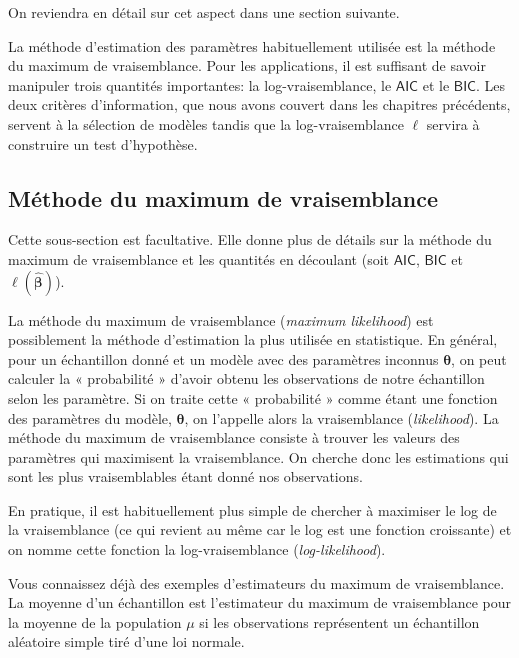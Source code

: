 \documentclass[
  11pt,
  letterpaper,
]{book}
\theoremstyle{definition}
\theoremstyle{definition}
\theoremstyle{definition}
\theoremstyle{definition}
\theoremstyle{remark}
\begin{document}
On reviendra en détail sur cet aspect dans une section suivante.

La méthode d'estimation des paramètres habituellement utilisée est la méthode du maximum de vraisemblance. Pour les applications, il est suffisant de savoir manipuler trois quantités importantes: la log-vraisemblance, le \(\mathsf{AIC}\) et le \(\mathsf{BIC}\). Les deux critères d'information, que nous avons couvert dans les chapitres précédents, servent à la sélection de modèles tandis que la log-vraisemblance \(\ell\) servira à construire un test d'hypothèse.

\hypertarget{muxe9thode-du-maximum-de-vraisemblance}{%
\subsection{Méthode du maximum de vraisemblance}\label{muxe9thode-du-maximum-de-vraisemblance}}

Cette sous-section est facultative. Elle donne plus de détails sur la méthode du maximum de vraisemblance et les quantités en découlant (soit \(\mathsf{AIC}\), \(\mathsf{BIC}\) et \(\ell(\widehat{\boldsymbol{\beta}})\)).

La méthode du maximum de vraisemblance (\emph{maximum likelihood}) est possiblement la méthode d'estimation la plus utilisée en statistique. En général, pour un échantillon donné et un modèle avec des paramètres inconnus \(\boldsymbol{\theta}\), on peut calculer la « probabilité » d'avoir obtenu les observations de notre échantillon selon les paramètre. Si on traite cette « probabilité » comme étant une fonction des paramètres du modèle, \(\boldsymbol{\theta}\), on l'appelle alors la vraisemblance (\emph{likelihood}). La méthode du maximum de vraisemblance consiste à trouver les valeurs des paramètres qui maximisent la vraisemblance. On cherche donc les estimations qui sont les plus vraisemblables étant donné nos observations.

En pratique, il est habituellement plus simple de chercher à maximiser le log de la vraisemblance (ce qui revient au même car le log est une fonction croissante) et on nomme cette fonction la log-vraisemblance (\emph{log-likelihood}).

Vous connaissez déjà des exemples d'estimateurs du maximum de vraisemblance. La moyenne d'un échantillon est l'estimateur du maximum de vraisemblance pour la moyenne de la population \(\mu\) si les observations représentent un échantillon aléatoire simple tiré d'une loi normale.
\end{document}
